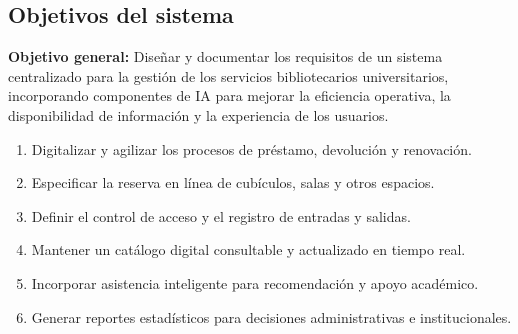 \documentclass[12pt,journal,onecolumn]{IEEEtran}
\begin{document}
\subsection{Objetivos del sistema}
\textbf{Objetivo general:} Diseñar y documentar los requisitos de un sistema centralizado para la gestión de los servicios bibliotecarios universitarios, incorporando componentes de IA para mejorar la eficiencia operativa, la disponibilidad de información y la experiencia de los usuarios.

\begin{enumerate}[label=OBJ-\arabic*]
\item Digitalizar y agilizar los procesos de préstamo, devolución y renovación.
\item Especificar la reserva en línea de cubículos, salas y otros espacios.
\item Definir el control de acceso y el registro de entradas y salidas.
\item Mantener un catálogo digital consultable y actualizado en tiempo real.
\item Incorporar asistencia inteligente para recomendación y apoyo académico.
\item Generar reportes estadísticos para decisiones administrativas e institucionales.
\end{enumerate}
\end{document}
